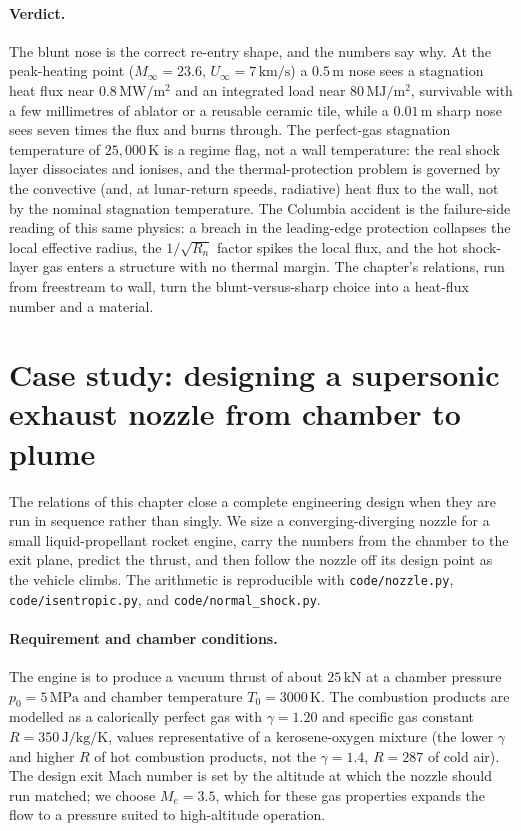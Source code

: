 \paragraph{Verdict.} The blunt nose is the correct re-entry shape, and
the numbers say why. At the peak-heating point ($M_\infty = 23.6$,
$U_\infty = 7\,\si{\kilo\meter\per\second}$) a $0.5\,\si{\meter}$ nose
sees a stagnation heat flux near $0.8\,\si{\mega\watt\per\meter\squared}$
and an integrated load near $80\,\si{\mega\joule\per\meter\squared}$,
survivable with a few millimetres of ablator or a reusable ceramic
tile, while a $0.01\,\si{\meter}$ sharp nose sees seven times the flux
and burns through. The perfect-gas stagnation temperature of
$25{,}000\,\si{\kelvin}$ is a regime flag, not a wall temperature: the
real shock layer dissociates and ionises, and the thermal-protection
problem is governed by the convective (and, at lunar-return speeds,
radiative) heat flux to the wall, not by the nominal stagnation
temperature. The Columbia accident \cite{acc:caib-columbia} is the
failure-side reading of this same physics: a breach in the
leading-edge protection collapses the local effective radius, the
$1/\sqrt{R_n}$ factor spikes the local flux, and the hot shock-layer gas
enters a structure with no thermal margin. The chapter's relations, run
from freestream to wall, turn the blunt-versus-sharp choice into a
heat-flux number and a material.

\section{Case study: designing a supersonic exhaust nozzle from
chamber to plume}

The relations of this chapter close a complete engineering design when
they are run in sequence rather than singly. We size a
converging-diverging nozzle for a small liquid-propellant rocket
engine, carry the numbers from the chamber to the exit plane, predict
the thrust, and then follow the nozzle off its design point as the
vehicle climbs. The arithmetic is reproducible with
\texttt{code/nozzle.py}, \texttt{code/isentropic.py}, and
\texttt{code/normal\_shock.py}.

\paragraph{Requirement and chamber conditions.} The engine is to
produce a vacuum thrust of about $25\,\text{kN}$ at a chamber pressure
$p_0 = 5\,\text{MPa}$ and chamber temperature $T_0 = 3000\,\si{
\kelvin}$. The combustion products are modelled as a calorically
perfect gas with $\gamma = 1.20$ and specific gas constant
$R = 350\,\si{\joule\per\kilogram\per\kelvin}$, values representative
of a kerosene-oxygen mixture (the lower $\gamma$ and higher $R$ of hot
combustion products, not the $\gamma = 1.4$, $R = 287$ of cold air).
The design exit Mach number is set by the altitude at which the nozzle
should run matched; we choose $M_e = 3.5$, which for these gas
properties expands the flow to a pressure suited to high-altitude
operation.

